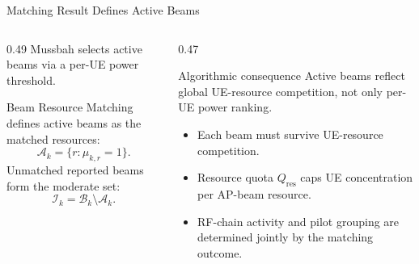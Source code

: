 \documentclass[10pt,aspectratio=169]{beamer}
\newcommand{\BRM}{Beam Resource Matching}
\newenvironment{tightitemize}{%
    \begin{itemize}
        \setlength{\itemsep}{2pt}
        \setlength{\parskip}{0pt}
        \setlength{\parsep}{0pt}
}{%
    \end{itemize}
}
\begin{document}
\begin{frame}{Matching Result Defines Active Beams}
    \small
    \begin{columns}[T,onlytextwidth]
        \begin{column}{0.49\textwidth}
            Mussbah selects active beams via a per-UE power threshold.

            \vspace{0.5em}
            \BRM{} defines active beams as the matched resources:
            \[
                \mathcal{A}_k=\{r:\mu_{k,r}=1\}.
            \]
            Unmatched reported beams form the moderate set:
            \[
                \mathcal{I}_k=\mathcal{B}_k\setminus\mathcal{A}_k.
            \]
        \end{column}
        \begin{column}{0.47\textwidth}
            \begin{block}{Algorithmic consequence}
                Active beams reflect global UE-resource competition, not only per-UE power ranking.
            \end{block}

            \begin{tightitemize}
                \item Each beam must survive UE-resource competition.
                \item Resource quota \(Q_{\mathrm{res}}\) caps UE concentration per AP-beam resource.
                \item RF-chain activity and pilot grouping are determined jointly by the matching outcome.
            \end{tightitemize}
        \end{column}
    \end{columns}
\end{frame}
\end{document}
